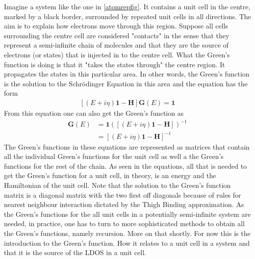 Imagine a system like the one in \cref{atomrepfig}. It contains a unit cell in the centre, marked by a black border, surrounded by repeated unit cells in all directions. The aim is to explain how electrons move through this region. Suppose all cells surrounding the centre cell are considered "contacts" in the sense that they represent a semi-infinite chain of molecules and that they are the source of electrons (or states) that is injected in to the centre cell. What the Green's function is doing is that it "takes the states through" the centre region. It propagates the states in this particular area. In other words, the Green's function is the solution to the Schr\"{o}dinger Equation in this area and the equation has the form
\begin{align}\label{Greensunsolved}
	[(E+i\eta)\mathbf{1}-\mathbf{H}]\mathbf{G}(E) = \mathbf{1}
\end{align}
From this equation one can also get the Green's function as
\begin{align}\label{Greenssolved}
	\mathbf{G}(E) & = \mathbf{1}([(E+i\eta)\mathbf{1}-\mathbf{H}])^{-1} \\
	              & = [(E+i\eta)\mathbf{1}-\mathbf{H}]^{-1}
\end{align}
The Green's functions in these equations are represented as matrices that contain all the individual Green's functions for the unit cell as well a the Green's functions for the rest of the chain. As seen in the equations, all that is needed to get the Green's function for a unit cell, in theory, is an energy and the Hamiltonian of the unit cell. Note that the solution to the Green's function matrix is a diagonal matrix with the two first off diagonals because of rules for nearest neighbour interaction dictated by the Thigh Binding approximation. As the Green's functions for the all unit cells in a potentially semi-infinite system are needed, in practice, one has to turn to more sophisticated methods to obtain all the Green's functions, namely recursion. More on that shortly. For now this is the introduction to the Green's function. How it relates to a unit cell in a system and that it is the source of the LDOS in a unit cell.\\
